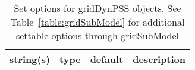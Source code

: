 \begin{table}[ht]
\centering
\begin{tabular}{p{5cm} c c p{7cm}}
\hline
string(s) & type & default & description \\
\hline
\hline
\end{tabular}
\caption{Set options for gridDynPSS objects. See Table~\ref{table:gridSubModel} for additional settable options through gridSubModel}
\label{table:gridDynPSS}
\end{table}

